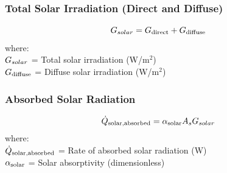 \subsubsection*{Total Solar Irradiation (Direct and Diffuse)}
\begin{equation}
    G_{solar} = G_{\text{direct}} + G_{\text{diffuse}}
\end{equation}
where: \\
$G_{solar}$ = Total solar irradiation (W/m$^2$) \\
$G_{\text{diffuse}}$ = Diffuse solar irradiation (W/m$^2$)

\subsubsection*{Absorbed Solar Radiation}
\begin{equation}
    \dot{Q}_{\text{solar,absorbed}} = \alpha_{\text{solar}} A_s G_{solar}
\end{equation}
where: \\
$\dot{Q}_{\text{solar,absorbed}}$ = Rate of absorbed solar radiation (W) \\
$\alpha_{\text{solar}}$ = Solar absorptivity (dimensionless)
